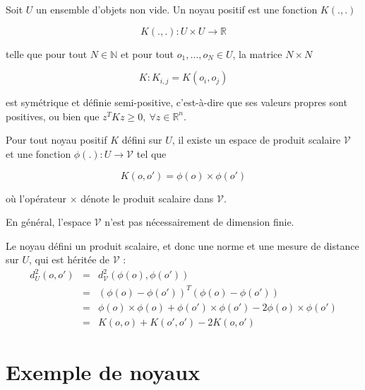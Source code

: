Soit $U$ un ensemble d'objets non vide. Un noyau positif est une fonction $K(., .)$

$$K(.,.) : U \times U \rightarrow \mathbb{R}$$

telle que pour tout $N \in \mathbb{N}$ et pour tout $o_1, \dots , o_N \in U$, la matrice $N \times N$

$$K : K_{i, j} = K(o_i, o_j)$$

est symétrique et définie semi-positive, c'est-à-dire que ses valeurs propres sont positives, ou bien que $z^T K z \geq 0, \: \forall z \in \mathbb{R}^n$.

Pour tout noyau positif $K$ défini sur $U$, il existe un espace de produit scalaire $\mathcal{V}$ et une fonction $\phi(.) : U \rightarrow \mathcal{V}$ tel que

$$K(o, o') = \phi(o) \times \phi(o')$$

où l'opérateur $\times$ dénote le produit scalaire dans $\mathcal{V}$.

En général, l'espace $\mathcal{V}$ n'est pas nécessairement de dimension finie.

Le noyau défini un produit scalaire, et donc une norme et une mesure de distance sur $U$, qui est héritée de $\mathcal{V}$ :
\begin{eqnarray*}
d^2_U(o, o') & = & d^2_\mathcal{V}(\phi(o), \phi(o')) \\
 & = & (\phi(o) - \phi(o'))^T(\phi(o) - \phi(o')) \\
 & = & \phi(o) \times \phi(o) + \phi(o') \times \phi(o') - 2 \phi(o) \times \phi(o') \\
 & = & K(o, o) + K(o', o') - 2 K(o, o')
\end{eqnarray*}

\section{Exemple de noyaux}


